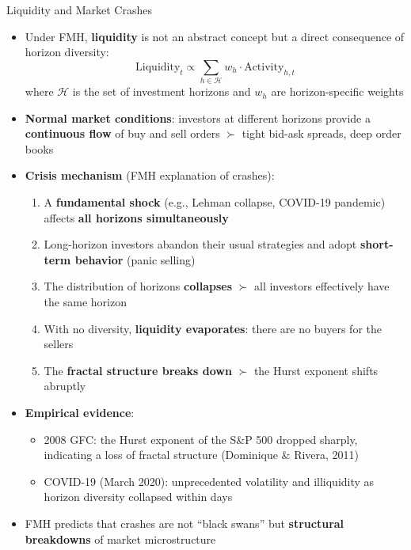 \documentclass[9pt, aspectratio=169, t]{beamer}
\theoremstyle{definition}
\begin{document}
\begin{frame}{Liquidity and Market Crashes}
    \begin{itemize}
        \item Under FMH, \textbf{liquidity} is not an abstract concept but a direct consequence of horizon diversity:
        \[
            \text{Liquidity}_t \propto \sum_{h \in \mathcal{H}} w_h \cdot \text{Activity}_{h,t}
        \]
        where $\mathcal{H}$ is the set of investment horizons and $w_h$ are horizon-specific weights
        \item \textbf{Normal market conditions}: investors at different horizons provide a \textbf{continuous flow} of buy and sell orders $\succ$ tight bid-ask spreads, deep order books
        \item \textbf{Crisis mechanism} (FMH explanation of crashes):
        \begin{enumerate}
            \item A \textbf{fundamental shock} (e.g., Lehman collapse, COVID-19 pandemic) affects \textbf{all horizons simultaneously}
            \item Long-horizon investors abandon their usual strategies and adopt \textbf{short-term behavior} (panic selling)
            \item The distribution of horizons \textbf{collapses} $\succ$ all investors effectively have the same horizon
            \item With no diversity, \textbf{liquidity evaporates}: there are no buyers for the sellers
            \item The \textbf{fractal structure breaks down} $\succ$ the Hurst exponent shifts abruptly
        \end{enumerate}
        \item \textbf{Empirical evidence}:
        \begin{itemize}
            \item 2008 GFC: the Hurst exponent of the S\&P 500 dropped sharply, indicating a loss of fractal structure (Dominique \& Rivera, 2011)
            \item COVID-19 (March 2020): unprecedented volatility and illiquidity as horizon diversity collapsed within days
        \end{itemize}
        \item FMH predicts that crashes are not ``black swans'' but \textbf{structural breakdowns} of market microstructure
    \end{itemize}
\end{frame}
\end{document}
